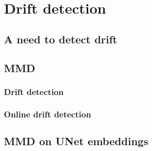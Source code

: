 \section{Drift detection}
    \subsection{A need to detect drift}
    \subsection{MMD}
        \subsubsection{Drift detection}
            
        \subsubsection{Online drift detection}
            
    \subsection{MMD on UNet embeddings}